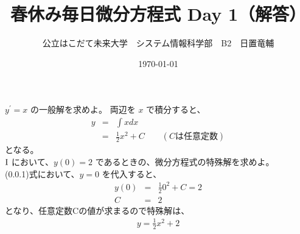 \documentclass[dvipdfmx,uplatex]{jsarticle}
\title{春休み毎日微分方程式 Day 1（解答）}
\author{公立はこだて未来大学　システム情報科学部　B2　日置竜輔}
\date{\today}
\begin{document}
\maketitle

\begin{qparts}
    \qpart $ y ^ {\prime} = x $ の一般解を求めよ。
    両辺を $ x $ で積分すると、\\
    \begin{eqnarray}
      y & = & \int x dx \nonumber \\
      & = & \frac{1}{2} x ^ 2 + C \qquad (Cは任意定数)
    \end{eqnarray}
    となる。\\

    \qpart $ \rm I $ において、$ y(0) = 2 $ であるときの、微分方程式の特殊解を求めよ。\\
    (0.0.1)式において、$ y = 0 $ を代入すると、
    \begin{eqnarray}
      y(0) & = & \frac{1}{2} 0 ^ 2 + C = 2 \nonumber \\
      C & = & 2 \nonumber
    \end{eqnarray}
    となり、任意定数Cの値が求まるので特殊解は、
    \begin{align*}
      y = \frac{1}{2} x ^ 2 + 2
    \end{align*}
\end{qparts}
\end{document}
